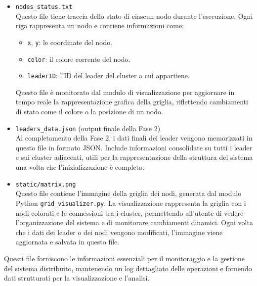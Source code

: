 \documentclass[12pt, a4paper]{report}
\begin{document}
\begin{itemize}
    \item \texttt{nodes\_status.txt} \\
    Questo file tiene traccia dello stato di ciascun nodo durante l'esecuzione. Ogni riga rappresenta un nodo e contiene informazioni come:
    \begin{itemize}
        \item \texttt{x}, \texttt{y}: le coordinate del nodo.
        \item \texttt{color}: il colore corrente del nodo.
        \item \texttt{leaderID}: l'ID del leader del cluster a cui appartiene.
    \end{itemize}
    Questo file è monitorato dal modulo di visualizzazione per aggiornare in tempo reale la rappresentazione grafica della griglia, riflettendo cambiamenti di stato come il colore o la posizione di un nodo.

    \item \texttt{leaders\_data.json} (output finale della Fase 2) \\
    Al completamento della Fase 2, i dati finali dei leader vengono memorizzati in questo file in formato JSON. Include informazioni consolidate su tutti i leader e sui cluster adiacenti, utili per la rappresentazione della struttura del sistema una volta che l'inizializzazione è completa.

    \item \texttt{static/matrix.png} \\
    Questo file contiene l'immagine della griglia dei nodi, generata dal modulo Python \texttt{grid\_visualizer.py}. La visualizzazione rappresenta la griglia con i nodi colorati e le connessioni tra i cluster, permettendo all'utente di vedere l'organizzazione del sistema e di monitorare cambiamenti dinamici. Ogni volta che i dati dei leader o dei nodi vengono modificati, l'immagine viene aggiornata e salvata in questo file.
\end{itemize}

Questi file forniscono le informazioni essenziali per il monitoraggio e la gestione del sistema distribuito, mantenendo un log dettagliato delle operazioni e fornendo dati strutturati per la visualizzazione e l'analisi.
\end{document}
